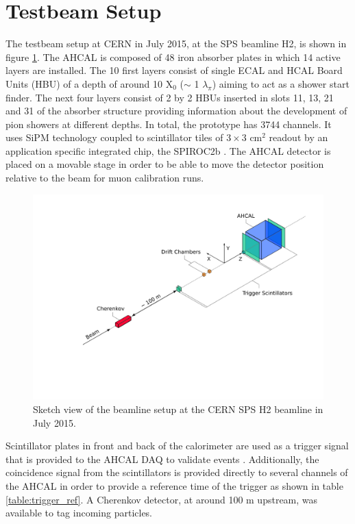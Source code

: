 \documentclass{JINST}
\begin{document}
\section{Testbeam Setup}

The testbeam setup at CERN in July 2015, at the SPS beamline H2, is shown in figure \ref{fig:TestbeamScketch}. The AHCAL is composed of 48 iron absorber plates in which 14 active layers are installed. The 10 first layers consist of single ECAL and HCAL Board Units (HBU) of a depth of around 10 X$_0$ ($\sim$ 1 $\lambda_{\pi}$) aiming to act as a shower start finder. The next four layers consist of 2 by 2 HBUs inserted in slots 11, 13, 21 and 31 of the absorber structure providing information about the development of pion showers at different depths. In total, the prototype has 3744 channels. It uses SiPM technology coupled to scintillator tiles of $3\times3$ cm$^2$ readout by an application specific integrated chip, the SPIROC2b \cite{5401891}. The AHCAL detector is placed on a movable stage in order to be able to move the detector position relative to the beam for muon calibration runs.

\begin{figure}[htbp!]
	\centering
	\includegraphics[width=0.7\linewidth]{fig/TestbeamSetup.pdf}
	\caption{Sketch view of the beamline setup at the CERN SPS H2 beamline in July 2015.} \label{fig:TestbeamScketch}
\end{figure}

Scintillator plates in front and back of the calorimeter are used as a trigger signal that is provided to the AHCAL DAQ to validate events \cite{Kvasnicka:CR_IEEE2016}. Additionally, the coincidence signal from the scintillators is provided directly to several channels of the AHCAL in order to provide a reference time of the trigger as shown in table \ref{table:trigger_ref}. A Cherenkov detector, at around 100 m upstream, was available to tag incoming particles.
\end{document}
